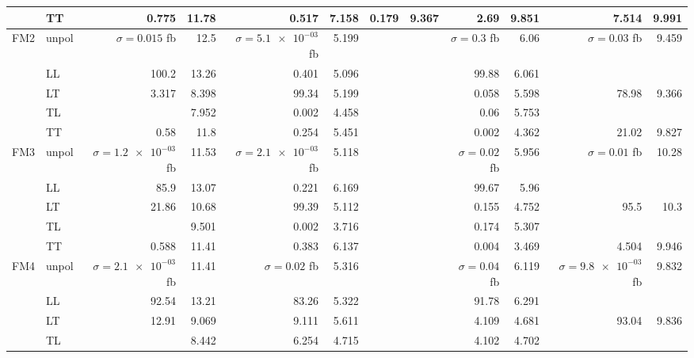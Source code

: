 \begin{table}[h]
{\begin{tabular}{llrrrrrrrrrr}
 & TT & \num{0.775} & \num{11.78} & \num{0.517} & \num{7.158} & \num{0.179} & \num{9.367} & \num{2.69} & \num{9.851} & \num{7.514} & \num{9.991} \\
\midrule
\multirow{5}{*}{FM2}
 & unpol & $\sigma = \num{0.015}$ fb & \num{12.5} & $\sigma = \num{5.1e-03}$ fb & \num{5.199} &  &  & $\sigma = \num{0.3}$ fb & \num{6.06} & $\sigma = \num{0.03}$ fb & \num{9.459} \\
 & LL & \num{100.2} & \num{13.26} & \num{0.401} & \num{5.096} &  &  & \num{99.88} & \num{6.061} &  &  \\
 & LT & \num{3.317} & \num{8.398} & \num{99.34} & \num{5.199} &  &  & \num{0.058} & \num{5.598} & \num{78.98} & \num{9.366} \\
 & TL &  & \num{7.952} & \num{0.002} & \num{4.458} &  &  & \num{0.06} & \num{5.753} &  &  \\
 & TT & \num{0.58} & \num{11.8} & \num{0.254} & \num{5.451} &  &  & \num{0.002} & \num{4.362} & \num{21.02} & \num{9.827} \\
\midrule
\multirow{5}{*}{FM3}
 & unpol & $\sigma = \num{1.2e-03}$ fb & \num{11.53} & $\sigma = \num{2.1e-03}$ fb & \num{5.118} &  &  & $\sigma = \num{0.02}$ fb & \num{5.956} & $\sigma = \num{0.01}$ fb & \num{10.28} \\
 & LL & \num{85.9} & \num{13.07} & \num{0.221} & \num{6.169} &  &  & \num{99.67} & \num{5.96} &  &  \\
 & LT & \num{21.86} & \num{10.68} & \num{99.39} & \num{5.112} &  &  & \num{0.155} & \num{4.752} & \num{95.5} & \num{10.3} \\
 & TL &  & \num{9.501} & \num{0.002} & \num{3.716} &  &  & \num{0.174} & \num{5.307} &  &  \\
 & TT & \num{0.588} & \num{11.41} & \num{0.383} & \num{6.137} &  &  & \num{0.004} & \num{3.469} & \num{4.504} & \num{9.946} \\
\midrule
\multirow{5}{*}{FM4}
 & unpol & $\sigma = \num{2.1e-03}$ fb & \num{11.41} & $\sigma = \num{0.02}$ fb & \num{5.316} &  &  & $\sigma = \num{0.04}$ fb & \num{6.119} & $\sigma = \num{9.8e-03}$ fb & \num{9.832} \\
 & LL & \num{92.54} & \num{13.21} & \num{83.26} & \num{5.322} &  &  & \num{91.78} & \num{6.291} &  &  \\
 & LT & \num{12.91} & \num{9.069} & \num{9.111} & \num{5.611} &  &  & \num{4.109} & \num{4.681} & \num{93.04} & \num{9.836} \\
 & TL &  & \num{8.442} & \num{6.254} & \num{4.715} &  &  & \num{4.102} & \num{4.702} &  &  \\

\end{tabular}}
\end{table}

